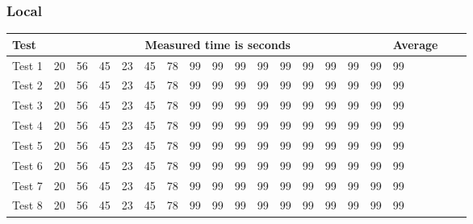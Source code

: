 \subsubsection{Local}
\begin{center}
    \begin{tabular}{| l | l | l | l | l | l | l | l | l | l | l | l | l | l | l | l | l | l | l |}
    \hline
    Test & \multicolumn{15}{|c|}{Measured time is seconds} & Average \\ \hline
    Test 1 & 20 & 56 & 45 & 23 & 45 & 78 & 99 & 99 & 99 & 99 & 99 & 99 & 99 & 99 & 99 & 99 \\ \hline
    Test 2 & 20 & 56 & 45 & 23 & 45 & 78 & 99 & 99 & 99 & 99 & 99 & 99 & 99 & 99 & 99 & 99 \\ \hline
    Test 3 & 20 & 56 & 45 & 23 & 45 & 78 & 99 & 99 & 99 & 99 & 99 & 99 & 99 & 99 & 99 & 99 \\ \hline
    Test 4 & 20 & 56 & 45 & 23 & 45 & 78 & 99 & 99 & 99 & 99 & 99 & 99 & 99 & 99 & 99 & 99 \\ \hline
    Test 5 & 20 & 56 & 45 & 23 & 45 & 78 & 99 & 99 & 99 & 99 & 99 & 99 & 99 & 99 & 99 & 99 \\ \hline
    Test 6 & 20 & 56 & 45 & 23 & 45 & 78 & 99 & 99 & 99 & 99 & 99 & 99 & 99 & 99 & 99 & 99 \\ \hline
    Test 7 & 20 & 56 & 45 & 23 & 45 & 78 & 99 & 99 & 99 & 99 & 99 & 99 & 99 & 99 & 99 & 99 \\ \hline
    Test 8 & 20 & 56 & 45 & 23 & 45 & 78 & 99 & 99 & 99 & 99 & 99 & 99 & 99 & 99 & 99 & 99 \\ \hline
    \end{tabular}
\end{center}
